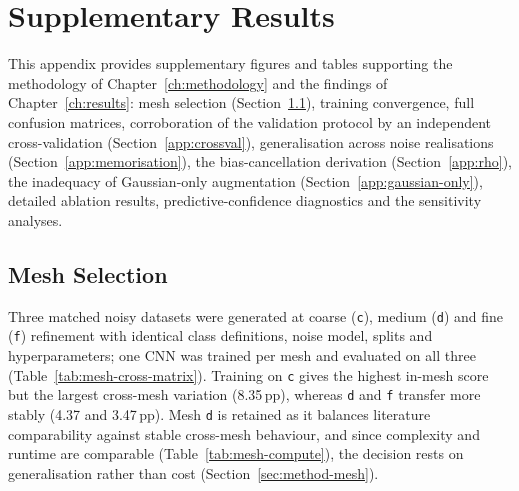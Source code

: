 
\chapter{Supplementary Results}
\label{app:supplementary}

This appendix provides supplementary figures and tables supporting the methodology of Chapter~\ref{ch:methodology} and the findings of Chapter~\ref{ch:results}: mesh selection (Section~\ref{app:mesh}), training convergence, full confusion matrices, corroboration of the validation protocol by an independent cross-validation (Section~\ref{app:crossval}), generalisation across noise realisations (Section~\ref{app:memorisation}), the bias-cancellation derivation (Section~\ref{app:rho}), the inadequacy of Gaussian-only augmentation (Section~\ref{app:gaussian-only}), detailed ablation results, predictive-confidence diagnostics and the sensitivity analyses.

\section{Mesh Selection}
\label{app:mesh}

Three matched noisy datasets were generated at coarse (\texttt{c}), medium (\texttt{d}) and fine (\texttt{f}) refinement with identical class definitions, noise model, splits and hyperparameters; one CNN was trained per mesh and evaluated on all three (Table~\ref{tab:mesh-cross-matrix}). Training on \texttt{c} gives the highest in-mesh score but the largest cross-mesh variation (8.35\,pp), whereas \texttt{d} and \texttt{f} transfer more stably (4.37 and 3.47\,pp). Mesh \texttt{d} is retained as it balances literature comparability against stable cross-mesh behaviour, and since complexity and runtime are comparable (Table~\ref{tab:mesh-compute}), the decision rests on generalisation rather than cost (Section~\ref{sec:method-mesh}).


